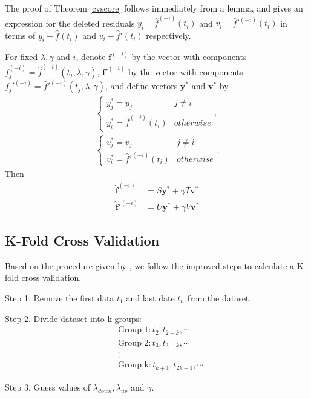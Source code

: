 The proof of Theorem \ref{cvscore} follows immediately from a lemma, and gives an expression for the deleted residuals $y_i-\hat{f}^{(-i)}(t_i)$ and $v_i-\hat{f}'^{(-i)}(t_i)$ in terms of $y_i-\hat{f}(t_i)$ and $v_i-\hat{f}'(t_i)$ respectively. 

\begin{lemma} \label{cvlemma}
For fixed $\lambda,\gamma$ and $i$, denote $\mathbf{f}^{(-i)}$ by the vector with components $f_j^{(-i)}=\hat{f}^{(-i)}(t_j,\lambda,\gamma)$,  $\mathbf{f}'^{(-i)}$ by the vector with components $f_j'^{(-i)}=\hat{f}'^{(-i)}(t_j,\lambda,\gamma)$, and define vectors $\mathbf{y}^*$ and $\mathbf{v}^*$ by 
\begin{align}
\begin{cases}
y_j^*=y_j &j \neq i\\
y_i^*=\hat{f}^{(-i)}(t_i) &otherwise
\end{cases},\\
\begin{cases}
v_j^*=v_j &j \neq i\\
v_i^*=\hat{f}'^{(-i)}(t_i) &otherwise
\end{cases}.
\end{align}
Then
\begin{align}
\mathbf{\hat{f}}^{(-i)}&=S\mathbf{y}^*+\gamma T\mathbf{v}^*\\
\mathbf{\hat{f}}'^{(-i)}&=U\mathbf{y}^*+\gamma V\mathbf{v}^*
\end{align}
\end{lemma}

\subsection{K-Fold Cross Validation}

Based on the procedure given by \cite{wahba1975completely}, we  follow the improved steps to calculate a K-fold cross validation. 

Step 1. Remove the first data $t_1$ and last date $t_n$ from the dataset.

Step 2. Divide dataset into k groups:
\begin{align*}
& \mbox{Group 1}: t_2, t_{2+k}, \cdots \\
& \mbox{Group 2}: t_3, t_{3+k}, \cdots \\
& \vdots \\
& \mbox{Group k}: t_{k+1}, t_{2k+1}, \cdots
\end{align*}


Step 3. Guess values of $\lambda_{down}, \lambda_{up}$ and $\gamma$.

